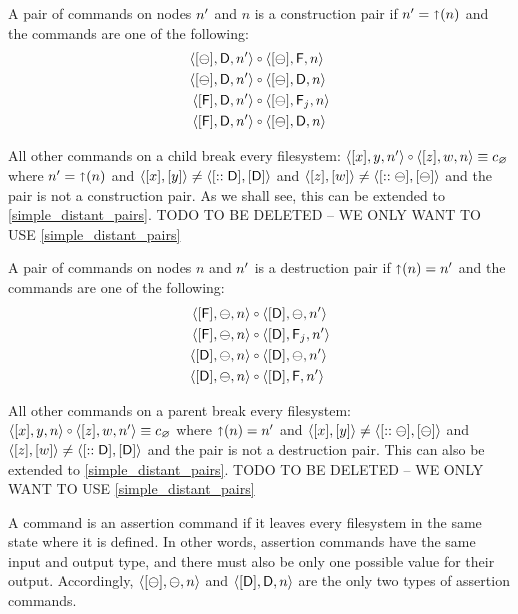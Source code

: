 \begin{mydef}
A pair of commands on nodes $n'$ and $n$ is a construction pair if $n'=\mathord{\shortuparrow}(n)$ 
and the commands are one
of the following:
   \begin{align*}
            \cbda{\nn}&\cc  \cbfa{n} \\
            \cbda{\nn}&\cc  \cbda{n} \\
            \cfda{\nn}&\cc  \caaa{\empt}{\valff}{n} \\
            \cfda{\nn}&\cc  \cbda{n}
   \end{align*}
\end{mydef}


\begin{myax}
All other commands on a child break every filesystem:
$\cxynnv\cc\czwnv \equiv \cbrk$ where $n'=\mathord{\shortuparrow}(n)$ and $\langle{[x],[y]}\rangle\neq\langle{[::\mathsf{D}],[\mathsf{D}]}\rangle$ and $\langle{[z],[w]}\rangle\neq\langle{[::\ominus],[\ominus]}\rangle$
and the pair is not a construction pair.
As we shall see, this can be extended to \cref{simple_distant_pairs}.
TODO TO BE DELETED -- WE ONLY WANT TO USE \cref{simple_distant_pairs}
\end{myax}

\begin{mydef}
A pair of commands on nodes $n$ and $n'$ is a destruction pair if $\mathord{\shortuparrow}(n)=n'$ and the commands are one
of the following:
   \begin{align*}
            \cfba{n}&\cc  \cdba{\nn} \\
            \cfba{n}&\cc  \caaa{\vald}{\valff}{\nn} \\
            \cdba{n}&\cc  \cdba{\nn} \\
            \cdba{n}&\cc  \cdfa{\nn}
   \end{align*}
\end{mydef}

\begin{myax}
All other commands on a parent break every filesystem:
$\cxynv\cc\czwnnv \equiv \cbrk$ where $\mathord{\shortuparrow}(n)=n'$ and $\langle{[x],[y]}\rangle\neq\langle{[::\ominus],[\ominus]}\rangle$ and $\langle{[z],[w]}\rangle\neq\langle{[::\mathsf{D}],[\mathsf{D}]}\rangle$
and the pair is not a destruction pair.
This can also be extended to \cref{simple_distant_pairs}.
TODO TO BE DELETED -- WE ONLY WANT TO USE \cref{simple_distant_pairs}
\end{myax}

\begin{mydef}
A command is an assertion command if
it leaves every filesystem in the same state
where it is defined.
In other words, assertion commands have the same input and output type,
and there must also be only one possible value for their output.
Accordingly, $\langle{[\ominus],\ominus,n}\rangle$ and $\langle{[\mathsf{D}],\mathsf{D},n}\rangle$ are the only two types of assertion commands.
\end{mydef}


